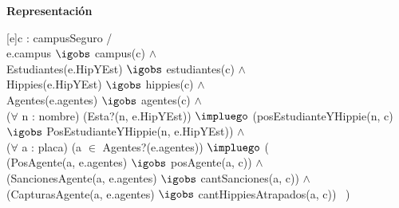\documentclass[a4paper,10pt]{article}
\newenvironment{Representacion}{%
  \vspace*{2ex}%
  \noindent\textbf{\Large Representación}%
  \vspace*{2ex}%
}{}
\begin{document}
\begin{Representacion}
{\begin{enumerate}
  \end{enumerate}

 }\mbox{}  
 
 [e]{c : campusSeguro / \\
   e.campus $\igobs$ campus(c) $\land$ \\
   Estudiantes(e.HipYEst) $\igobs$ estudiantes(c) $\land$ \\
   Hippies(e.HipYEst) $\igobs$ hippies(c) $\land$ \\
   Agentes(e.agentes) $\igobs$ agentes(c) $\land$ \\
   ($\forall$ n : nombre) (Esta?(n, e.HipYEst)) $\impluego$ (posEstudianteYHippie(n, c) $\igobs$ PosEstudianteYHippie(n, e.HipYEst)) $\land$ \\
   ($\forall$ a : placa) (a $\in$ Agentes?(e.agentes)) $\impluego$ (\\
   (PosAgente(a, e.agentes) $\igobs$ posAgente(a, c)) $\land$ \\
   (SancionesAgente(a, e.agentes) $\igobs$ cantSanciones(a, c)) $\land$ \\
   (CapturasAgente(a, e.agentes) $\igobs$ cantHippiesAtrapados(a, c)) \ )}
\end{Representacion}
 
\end{document}
